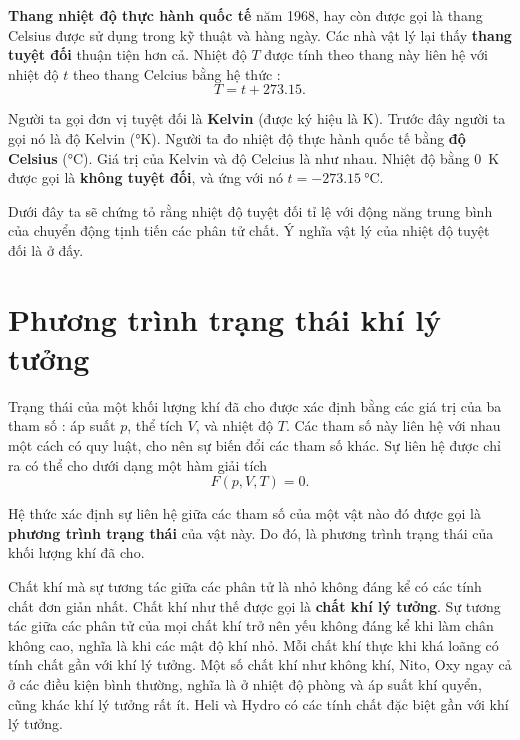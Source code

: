 \textbf{Thang nhiệt độ thực hành quốc tế} năm 1968, hay còn được gọi là thang Celsius được sử dụng trong kỹ thuật và hàng ngày. Các nhà vật lý lại thấy \textbf{thang tuyệt đối} thuận tiện hơn cả. Nhiệt độ $T$ được tính theo thang này liên hệ với nhiệt độ $t$ theo thang Celcius bằng hệ thức :
\begin{equation*}
	T = t + 273.15.
\end{equation*}

\noindent
Người ta gọi đơn vị tuyệt đối là \textbf{Kelvin} (được ký hiệu là \si{\kelvin}). Trước đây người ta gọi nó là độ Kelvin (\si{\degree}K). Người ta đo nhiệt độ thực hành quốc tế bằng \textbf{độ Celsius} (\si{\degreeCelsius}). Giá trị của Kelvin và độ Celcius là như nhau. Nhiệt độ bằng \SI{0}{\kelvin} được gọi là  \textbf{không tuyệt đối}, và ứng với nó $t=\SI{-273.15}{\degreeCelsius}$.

Dưới đây ta sẽ chứng tỏ rằng nhiệt độ tuyệt đối tỉ lệ với động năng trung bình của chuyển động tịnh tiến các phân tử chất. Ý nghĩa vật lý của nhiệt độ tuyệt đối là ở đấy. 

\section{Phương trình trạng thái khí lý tưởng}\label{sec:10_8}

Trạng thái của một khối lượng khí đã cho được xác định bằng các giá trị của ba tham số : áp suất $p$, thể tích $V$, và nhiệt độ $T$. Các tham số này liên hệ với nhau một cách có quy luật, cho nên sự biến đổi các tham số khác. Sự liên hệ được chỉ ra có thể cho dưới dạng một hàm giải tích
\begin{equation}\label{eq:10_15}
	F(p,V,T) = 0.
\end{equation}

Hệ thức xác định sự liên hệ giữa các tham số của một vật nào đó được gọi là \textbf{phương trình trạng thái} của vật này. Do đó,  là phương trình trạng thái của khối lượng khí đã cho.

Chất khí mà sự tương tác giữa các phân tử là nhỏ không đáng kể có các tính chất đơn giản nhất. Chất khí như thế được gọi là \textbf{chất khí lý tưởng}. Sự tương tác giữa các phân tử của mọi chất khí trở nên yếu không đáng kể khi làm chân không cao, nghĩa là khi các mật độ khí nhỏ. Mỗi chất khí thực khi khá loãng có tính chất gần với khí lý tưởng. Một số chất khí như không khí, Nito, Oxy ngay cả ở các điều kiện bình thường, nghĩa là ở nhiệt độ phòng và áp suất khí quyển, cũng khác khí lý tưởng rất ít. Heli và Hydro có các tính chất đặc biệt gần với khí lý tưởng. 

